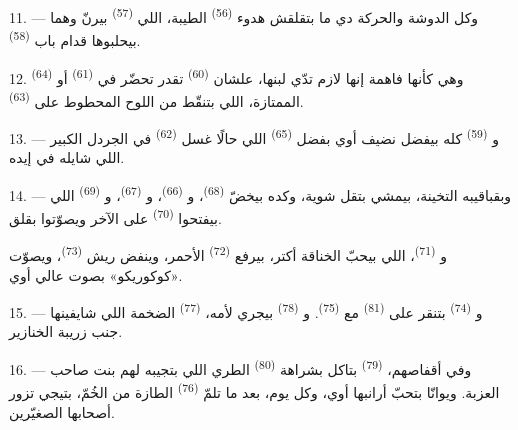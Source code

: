11. --- وكل الدوشة والحركة دي ما بتقلقش هدوء 
\textsuperscript{(56)} الطيبة، اللي  \textsuperscript{(57)} بيرنّ وهما
بيحلبوها قدام باب  \textsuperscript{(58)}.

12. وهي كأنها فاهمة إنها لازم تدّي لبنها، علشان 
\textsuperscript{(60)} تقدر تحضّر  في 
\textsuperscript{(61)} أو  \textsuperscript{(64)} الممتازة، اللي بتنقّط
من اللوح المحطوط على  \textsuperscript{(63)}.

13. --- و \textsuperscript{(59)} كله بيفضل نضيف أوي بفضل
 \textsuperscript{(65)} اللي حالًا غسل 
\textsuperscript{(62)} في الجردل الكبير اللي شايله في إيده.

\VUsaut{3.0mm}
\VUsaut{3.0mm}

14. --- وبقباقيبه التخينة، بيمشي بتقل شوية، وكده بيخضّ 
\textsuperscript{(68)}، و \textsuperscript{(66)}، و
\textsuperscript{(67)}، و \textsuperscript{(69)} اللي بيفتحوا
 \textsuperscript{(70)} على الآخر ويصوّتوا بقلق.

و \textsuperscript{(71)}، اللي بيحبّ الخناقة أكتر، بيرفع 
\textsuperscript{(72)} الأحمر، وينفض ريش  \textsuperscript{(73)}، ويصوّت
«كوكوريكو» بصوت عالي أوي.

15. --- و \textsuperscript{(74)} بتنقر على 
\textsuperscript{(81)} مع  \textsuperscript{(75)}.
و \textsuperscript{(78)} بيجري لأمه، 
\textsuperscript{(77)} الضخمة اللي شايفينها جنب زريبة الخنازير.

16. --- وفي أقفاصهم،  \textsuperscript{(79)} بتاكل بشراهة
 \textsuperscript{(80)} الطري اللي بتجيبه لهم بنت صاحب العزبة.
ويوانّا بتحبّ أرانبها أوي، وكل يوم، بعد ما تلمّ  \textsuperscript{(76)}
الطازة من الخُمّ، بتيجي تزور أصحابها الصغيّرين.

\VUsaut{6.0mm}
\VUfilet{22mm}
